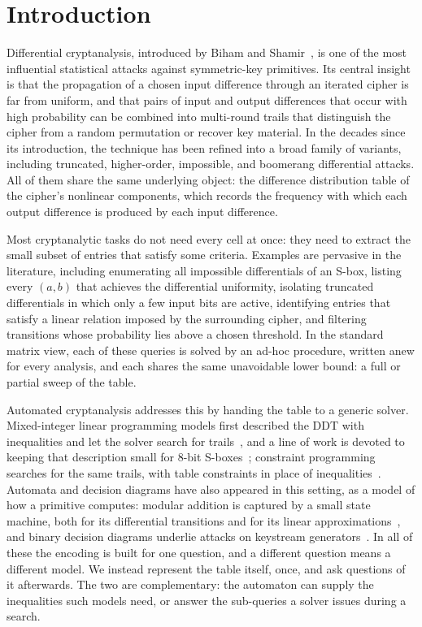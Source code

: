\documentclass[runningheads]{llncs}
\begin{document}
\section{Introduction}

Differential cryptanalysis, introduced by Biham and Shamir~\cite{BihamAndShamir1991}, is one
of the most influential statistical attacks against symmetric-key primitives. Its
central insight is that the propagation of a chosen input difference through an
iterated cipher is far from uniform, and that pairs of input and output
differences that occur with high probability can be combined into multi-round
trails that distinguish the cipher from a random permutation or recover key
material. In the decades since its introduction, the technique has been refined
into a broad family of variants, including truncated, higher-order, impossible,
and boomerang differential attacks. All of them share the same underlying object:
the difference distribution table of the cipher's nonlinear components, which
records the frequency with which each output difference is produced by each input
difference.

Most cryptanalytic tasks do not need every cell at once: they need
to extract the small subset of entries that satisfy some criteria.
Examples are pervasive in the literature, including enumerating all impossible
differentials of an S-box, listing every $(a,b)$ that achieves the differential
uniformity, isolating truncated differentials in which only a few input bits are
active, identifying entries that satisfy a linear relation imposed by the
surrounding cipher, and filtering transitions whose probability lies above a
chosen threshold. In the standard matrix view, each of these queries is solved by
an ad-hoc procedure, written anew for every analysis, and each shares the same
unavoidable lower bound: a full or partial sweep of the table.

Automated cryptanalysis addresses this by handing the table to a generic solver.
Mixed-integer linear programming models first described the DDT with
inequalities and let the solver search for trails~\cite{SunEtAl2014}, and a line
of work is devoted to keeping that description small for $8$-bit
S-boxes~\cite{AbdelkhalekEtAl2017,SasakiAndTodo2017,BouraAndCoggia2020};
constraint programming searches for the same trails, with table constraints in
place of inequalities~\cite{GeraultEtAl2020}. Automata and decision diagrams have also
appeared in this setting, as a model of how a primitive computes: modular
addition is captured by a small state machine, both for its differential
transitions and for its linear approximations~\cite{MouhaEtAl2010,Wallen2003},
and binary decision diagrams underlie attacks on keystream
generators~\cite{Krause2002}. In all of these the encoding is built for one
question, and a different question means a different model. We instead represent
the table itself, once, and ask questions of it afterwards. The two are
complementary: the automaton can supply the inequalities such models need, or
answer the sub-queries a solver issues during a search.
\end{document}
